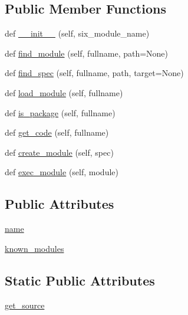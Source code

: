 \subsection*{Public Member Functions}
\begin{DoxyCompactItemize}
\item 
def \hyperlink{classsix_1_1__SixMetaPathImporter_af0274fb3033e7c7668e90a5acf89547a}{\+\_\+\+\_\+init\+\_\+\+\_\+} (self, six\+\_\+module\+\_\+name)
\item 
def \hyperlink{classsix_1_1__SixMetaPathImporter_a12a22cc298daa6af519256715c9b7d43}{find\+\_\+module} (self, fullname, path=None)
\item 
def \hyperlink{classsix_1_1__SixMetaPathImporter_a91ae5b8b8bd20dcbdf7ea0f97313faec}{find\+\_\+spec} (self, fullname, path, target=None)
\item 
def \hyperlink{classsix_1_1__SixMetaPathImporter_aa1d439f07783884d4d9856b82b82061d}{load\+\_\+module} (self, fullname)
\item 
def \hyperlink{classsix_1_1__SixMetaPathImporter_a442b9688b6f1dac8cfdc6d622b0a191d}{is\+\_\+package} (self, fullname)
\item 
def \hyperlink{classsix_1_1__SixMetaPathImporter_af17c478b4ec0437d4d86d040295261f9}{get\+\_\+code} (self, fullname)
\item 
def \hyperlink{classsix_1_1__SixMetaPathImporter_a69596da7d0e25f87906245a51319b0b2}{create\+\_\+module} (self, spec)
\item 
def \hyperlink{classsix_1_1__SixMetaPathImporter_a984dcbea3b4085fcf89a8b1a98d1ab11}{exec\+\_\+module} (self, module)
\end{DoxyCompactItemize}
\subsection*{Public Attributes}
\begin{DoxyCompactItemize}
\item 
\hyperlink{classsix_1_1__SixMetaPathImporter_ab3f5fb09f8ab79a506e1d32303df0c7b}{name}
\item 
\hyperlink{classsix_1_1__SixMetaPathImporter_a3ea28c1798d43286a56ecb40e14ef106}{known\+\_\+modules}
\end{DoxyCompactItemize}
\subsection*{Static Public Attributes}
\begin{DoxyCompactItemize}
\item 
\hyperlink{classsix_1_1__SixMetaPathImporter_a0b3f68544bd92fe7829e9ce96143aec6}{get\+\_\+source}
\end{DoxyCompactItemize}


